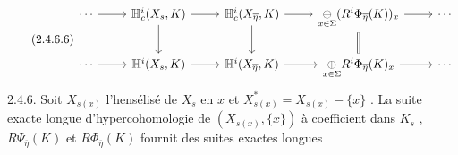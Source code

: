 \begin{equation}\tag{2.4.6.6}
\begin{tikzcd}
\cdots \arrow[r] & \mathbb{H}^i_c(X_s, K) \arrow[r] \arrow[d] & \mathbb{H}^i_c(X_{\overline{\eta}}, K) \arrow[r] \arrow[d] & \underset{x \in \Sigma}{\oplus} (R^i\Phi_{\overline{\eta}}(K))_x \arrow[r] \arrow[d, equal] & \cdots \\
\cdots \arrow[r] & \mathbb{H}^i(X_s, K) \arrow[r] & \mathbb{H}^i(X_{\overline{\eta}}, K) \arrow[r] & \underset{x \in \Sigma}{\oplus} R^i\Phi_{\overline{\eta}}(K)_x \arrow[r] & \cdots
\end{tikzcd}
\end{equation}
2.4.6.   Soit $X_{s(x)}$ l'hensélisé de $X_s$ en $x$ et $X^{*}_{s(x)} = X_{s(x)} - \{x\}$ . La suite exacte longue d'hypercohomologie de $(X_{s(x)}, \{x\})$ à coefficient dans $K_s$ , $R\Psi_{\overline{\eta}}(K)$ et $R\Phi_{\overline{\eta}}(K)$ fournit des suites exactes longues


